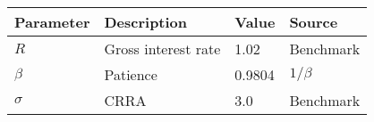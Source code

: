\begin{tabular}{l l l l} 
\hline 
Parameter & Description & Value & Source \\ 
\hline 
$R$ & Gross interest rate  & 1.02 & Benchmark \\ 
$\beta$ & Patience & 0.9804 & $1/\beta$ \\ 
$\sigma$ & CRRA & 3.0 & Benchmark \\ 
\end{tabular}